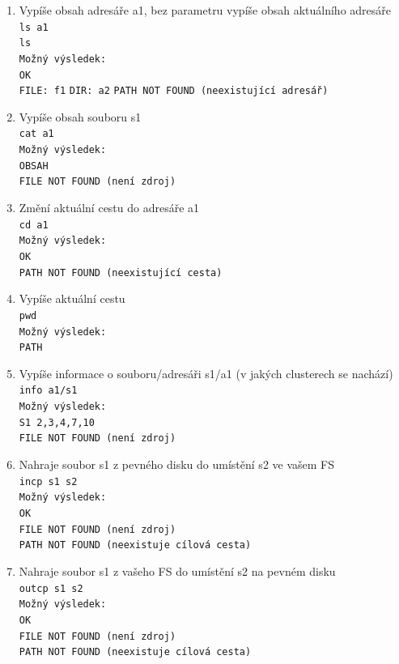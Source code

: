 \documentclass[12pt]{report}
\begin{document}
\begin{enumerate}
		\item Vypíše obsah adresáře a1, bez parametru vypíše obsah aktuálního adresáře\\
		\texttt{ls a1}\\
		\texttt{ls}\\
		\texttt{Možný výsledek:}\\
		\texttt{OK}\\
		\texttt{FILE: f1}
		\texttt{DIR: a2}
		\texttt{PATH NOT FOUND (neexistující adresář)}
		
		\item Vypíše obsah souboru s1\\
		\texttt{cat a1}\\
		\texttt{Možný výsledek:}\\
		\texttt{OBSAH}\\
		\texttt{FILE NOT FOUND (není zdroj)}
		
		\item Změní aktuální cestu do adresáře a1\\
		\texttt{cd a1}\\
		\texttt{Možný výsledek:}\\
		\texttt{OK}\\
		\texttt{PATH NOT FOUND (neexistující cesta)}
		
		\item Vypíše aktuální cestu\\
		\texttt{pwd}\\
		\texttt{Možný výsledek:}\\
		\texttt{PATH}
		
		\item Vypíše informace o souboru/adresáři s1/a1 (v jakých clusterech se nachází)\\
		\texttt{info a1/s1}\\
		\texttt{Možný výsledek:}\\
		\texttt{S1 2,3,4,7,10}\\
		\texttt{FILE NOT FOUND (není zdroj)}
		
		\item Nahraje soubor s1 z pevného disku do umístění s2 ve vašem FS\\
		\texttt{incp s1 s2}\\
		\texttt{Možný výsledek:}\\
		\texttt{OK}\\
		\texttt{FILE NOT FOUND (není zdroj)}\\
		\texttt{PATH NOT FOUND (neexistuje cílová cesta)}
		
		\item Nahraje soubor s1 z vašeho FS do umístění s2 na pevném disku\\
		\texttt{outcp s1 s2}\\
		\texttt{Možný výsledek:}\\
		\texttt{OK}\\
		\texttt{FILE NOT FOUND (není zdroj)}\\
		\texttt{PATH NOT FOUND (neexistuje cílová cesta)}
		

\end{enumerate}
\end{document}
